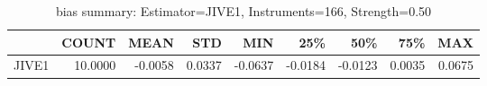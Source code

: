 \begin{table}[ht]
\centering
\caption{bias summary: Estimator=JIVE1, Instruments=166, Strength=0.50}
\begin{tabular}{lrrrrrrrr}
\toprule
 & COUNT & MEAN & STD & MIN & 25\% & 50\% & 75\% & MAX \\
\midrule
JIVE1 & 10.0000 & -0.0058 & 0.0337 & -0.0637 & -0.0184 & -0.0123 & 0.0035 & 0.0675 \\
\bottomrule
\end{tabular}
\end{table}
